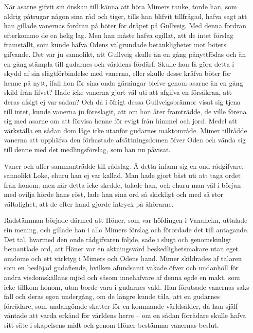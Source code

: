 När asarne gifvit sin önskan till känna att höra Mimers tanke, torde
han, som aldrig påtrugar någon sina råd och tiger, tills han blifvit
tillfrågad, hafva sagt att han gillade vanernas fordran på böter för
dråpet på Gullveig. Med denna fordran efterkommo de en helig lag. Men
han måste hafva ogillat, att de intet förslag framställt, som kunde
häfva Odens välgrundade betänkligheter mot böters gifvande. Det var ju
sannolikt, att Gullveig skulle än en gång pånyttfödas och än en gång
stämpla till gudarnes och världens fördärf. Skulle hon få göra detta i
skydd af sin slägtförbindelse med vanerna, eller skulle desse kräfva
böter för henne på nytt, ifall hon för sina onda gärningar blefve genom
asarne än en gång
\protect\hypertarget{lb1625905.xhtmlux5cux23start146}{}{}\protect\hypertarget{lb1625905.xhtmlux5cux23start146-a}{}{}\protect\hypertarget{lb1625905.xhtmlux5cux23start146-b}{}{}\protect\hypertarget{lb1625905.xhtmlux5cux23start146-c}{}{}\protect\hypertarget{lb1625905.xhtmlux5cux23start146-d}{}{}
skild från lifvet? Hade icke vanerna gjort väl uti att afgifva en
försäkran, att deras afsigt ej var sådan? Och då i öfrigt dessa
Gullveigsbrännor visat sig tjena till intet, kunde vanerna ju
föreslagit, att om hon åter framträdde, de ville förena sig med asarne
om att förvisa henne för evigt från himmel och jord. Medel att
värkställa en sådan dom låge icke utanför gudarnes maktområde. Mimer
tillrådde vanerna att upphäfva den förhastade afsättningsdomen öfver
Oden och vända sig till denne med det medlingsförslag, som han nu
påvisat.

Vaner och alfer sammanträdde till rådslag. Å detta infann sig en ond
rådgifvare, sannolikt Loke, ehuru han ej var kallad. Man hade gjort bäst
uti att taga ordet från honom; men när detta icke skedde, talade han,
och ehuru man väl i början med ovilja hörde hans röst, lade han sina ord
så skickligt och med så stor vältalighet, att de efter hand gjorde
intryck på åhörarne.

Rådstämman började därmed att Höner, som var höfdingen i Vanaheim,
uttalade sin mening, och gillade han i allo Mimers förslag och förordade
det till antagande. Det tal, hvarmed den onde rådgifvaren följde, sade i
slugt och genomskinligt bemantlade ord, att Höner var en aktningsvärd
beskedlighetsmakare utan eget omdöme och ett värktyg i Mimers och Odens
hand. Mimer skildrades af talaren som en beslöjad gudafiende, hvilken
afundsamt vakade öfver och undanhöll för andra visdomskällans mjöd och
såsom innehafvare af denna egde en makt, som icke tillkom honom, utan
borde vara i gudarnes våld. Han förutsade vanernas saks fall och deras
egen undergång, om de längre kunde tåla, att en gudarnes förrädare, som
undangömde skatter för en kommande världsålder, då han själf väntade att
varda erkänd för världens herre -- om en sådan förrädare skulle hafva
sitt säte i skapelsens midt och genom Höner bestämma vanernas beslut.

